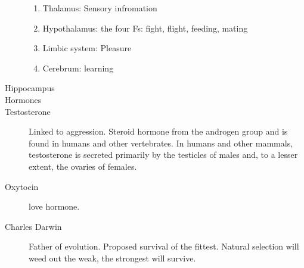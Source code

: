 \documentclass{article}
\begin{document}
\begin{description}
    \begin{enumerate}
        \item Thalamus: Sensory infromation
        \item Hypothalamus: the four Fs: fight, flight, feeding, mating
        \item Limbic system: Pleasure
        \item Cerebrum: learning
    \end{enumerate}
    \item [Hippocampus]
    \item [Hormones]
    \item [Testosterone] Linked to aggression. Steroid hormone from the androgen group and is found in humans and other vertebrates. In humans and other mammals, testosterone is secreted primarily by the testicles of males and, to a lesser extent, the ovaries of females.
    \item [Oxytocin] love hormone.
    \item [Charles Darwin] Father of evolution. Proposed survival of the fittest. Natural selection will weed out the weak, the strongest will survive.
\end{description}
\end{document}
